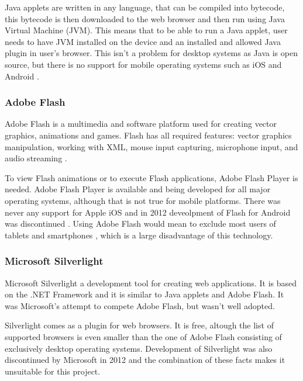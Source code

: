Java applets are written in any language, that can be compiled into bytecode, this bytecode is then downloaded to the web browser and then run using Java Virtual Machine (JVM). This means that to be able to run a Java applet, user needs to have JVM installed on the device and an installed and allowed Java plugin in user's browser. This isn't a problem for desktop systems as Java is open source, but there is no support for mobile operating systems such as iOS and Android \cite{}. 

\subsubsection{Adobe Flash}
Adobe Flash is a multimedia and software platform used for creating vector graphics, animations and games. Flash has all required features: vector graphics manipulation, working with XML, mouse input capturing, microphone input, and audio streaming \cite{}. 

To view Flash animations or to execute Flash applications, Adobe Flash Player is needed. Adobe Flash Player is available and being developed for all major operating systems, although that is not true for mobile platforms. There was never any support for Apple iOS \cite{} and in 2012 deveolpment of Flash for Android was discontinued \cite{}. Using Adobe Flash would mean to exclude most users of tablets and smartphones \cite{}, which is a large disadvantage of this technology.

\subsubsection{Microsoft Silverlight}
Microsoft Silverlight \cite{} a development tool for creating web applications. It is based on the .NET Framework and it is similar to Java applets and Adobe Flash. It was Microsoft's attempt to compete Adobe Flash, but wasn't well adopted.

Silverlight comes as a plugin for web browsers. It is free, altough the list of supported browsers is even smaller \cite{} than the one of Adobe Flash consisting of exclusively desktop operating systems. Development of Silverlight was also discontinued by Microsoft in 2012 and the combination of these facts makes it unsuitable for this project.

